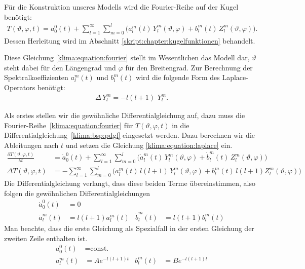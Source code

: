 \begin{refsection}
Für die Konstruktion unseres Modells wird die Fourier-Reihe auf der Kugel benötigt:
\begin{align}
T(\vartheta ,\varphi ,t)
=
a^0_0(t) + \sum_{l=1}^\infty\sum_{m=0}^l \bigl( a^m_l(t)\,Y^m_l(\vartheta ,\varphi)+b^m_l(t)\,Z^m_l(\vartheta ,\varphi) \bigr).
\label{klima:equation:fourier}
\end{align}
Dessen Herleitung wird im Abschnitt \ref{skript:chapter:kugelfunktionen}  behandelt.

Diese Gleichung \eqref{klima:equation:fourier} stellt im Wesentlichen das Modell dar, $\vartheta$ steht dabei für den Längengrad und $\varphi$ für den Breitengrad. Zur Berechnung der Spektralkoeffizienten $a^m_l(t)$ und $b^m_l(t)$ wird die folgende Form des Laplace-Operators benötigt:
\begin{align}
\Delta \,Y^m_l=-l(l+1)\,\,Y^m_l.
\label{klima:equation:laplace}
\end{align}

Als erstes stellen wir die gewöhnliche Differentialgleichung auf, dazu muss die Fourier-Reihe~\eqref{klima:equation:fourier} für $T(\vartheta ,\varphi ,t)$ in die Differentialgleichung~\eqref{klima:bsp:pdgl} eingesetzt werden.
Dazu berechnen wir die Ableitungen nach $t$ und setzen die Gleichung \eqref{klima:equation:laplace} ein.
\begin{align*}
\frac{\partial T(\vartheta ,\varphi ,t)}{\partial t} &=
\dot{a}^0_0(t)+\sum_{l=1}^\infty\sum_{m=0}^l \bigl( \dot{a}^m_l(t)\,Y^m_l(\vartheta ,\varphi)+\dot{b}^m_l(t)\,Z^m_l(\vartheta ,\varphi)\bigr)
\\
\Delta T(\vartheta ,\varphi ,t) &=
- \sum_{l=1}^\infty\sum_{m=0}^l \bigl( a^m_l(t)\,l(l+1)\,Y^m_l(\vartheta ,\varphi)+b^m_l(t)\,l(l+1)Z^m_l(\vartheta ,\varphi)\bigr)
\end{align*}
Die Differentialgleichung verlangt, dass diese beiden Terme übereinstimmen, also folgen die gewöhnlichen Differentialgleichungen
\begin{align*}
\dot a^0_0(t)&= 0
\\
\dot a^m_l(t)&=l(l+1)a^m_l(t)&
\dot b^m_l(t)&=l(l+1)b^m_l(t)
\end{align*}
Man beachte, dass die erste Gleichung als Spezialfall in der ersten
Gleichung der zweiten Zeile enthalten ist.
\begin{align*}
a^0_0(t)&=\text{const.}
\\
a^m_l(t) &=Ae^{-l(l+1)t}&
b^m_l(t) &=Be^{-l(l+1)t}
\end{align*}


\end{refsection}
